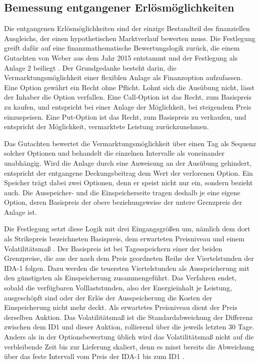 \subsection{Bemessung entgangener Erlösmöglichkeiten}
\label{sec:weber_approach}

Die entgangenen Erlösmöglichkeiten sind der einzige Bestandteil des finanziellen Ausgleichs, der einen hypothetischen Marktverlauf bewerten muss.
Die Festlegung greift dafür auf eine finanzmathematische Bewertungslogik zurück, die einem Gutachten von Weber aus dem Jahr 2015 entstammt und der Festlegung als Anlage 2 beiliegt \cite{bundesnetzagentur_festlegung_2024, weber_gutachten_2015}.
Der Grundgedanke besteht darin, die Vermarktungsmöglichkeit einer flexiblen Anlage als Finanzoption aufzufassen.
Eine Option gewährt ein Recht ohne Pflicht.
Lohnt sich die Ausübung nicht, lässt der Inhaber die Option verfallen.
Eine Call-Option ist das Recht, zum Basispreis zu kaufen, und entspricht bei einer Anlage der Möglichkeit, bei steigendem Preis einzuspeisen.
Eine Put-Option ist das Recht, zum Basispreis zu verkaufen, und entspricht der Möglichkeit, vermarktete Leistung zurückzunehmen.

Das Gutachten bewertet die Vermarktungsmöglichkeit über einen Tag als Sequenz solcher Optionen und behandelt die einzelnen Intervalle als voneinander unabhängig.
Wird die Anlage durch eine Anweisung an der Ausübung gehindert, entspricht der entgangene Deckungsbeitrag dem Wert der verlorenen Option.
Ein Speicher trägt dabei zwei Optionen, denn er speist nicht nur ein, sondern bezieht auch.
Die Ausspeicher- und die Einspeicherseite tragen deshalb je eine eigene Option, deren Basispreis der obere beziehungsweise der untere Grenzpreis der Anlage ist.

Die Festlegung setzt diese Logik mit drei Eingangsgrößen um, nämlich dem dort als Strikepreis bezeichneten Basispreis, dem erwarteten Preisniveau und einem Volatilitätsmaß \cite{bundesnetzagentur_anlage1_2024}.
Der Basispreis ist bei Tagesspeichern einer der beiden Grenzpreise, die aus der nach dem Preis geordneten Reihe der Viertelstunden der \ac{IDA-1} folgen.
Dazu werden die teuersten Viertelstunden als Ausspeicherung mit den günstigsten als Einspeicherung zusammengeführt.
Das Verfahren endet, sobald die verfügbaren Volllaststunden, also der Energieinhalt je Leistung, ausgeschöpft sind oder der Erlös der Ausspeicherung die Kosten der Einspeicherung nicht mehr deckt.
Als erwartetes Preisniveau dient der Preis derselben Auktion.
Das Volatilitätsmaß ist die Standardabweichung der Differenz zwischen dem \ac{ID1} und dieser Auktion, rollierend über die jeweils letzten 30 Tage.
Anders als in der Optionsbewertung üblich wird das Volatilitätsmaß nicht auf die verbleibende Zeit bis zur Lieferung skaliert, denn es misst bereits die Abweichung über das feste Intervall vom Preis der \ac{IDA-1} bis zum \ac{ID1} \cite{hull_options_2014}.


